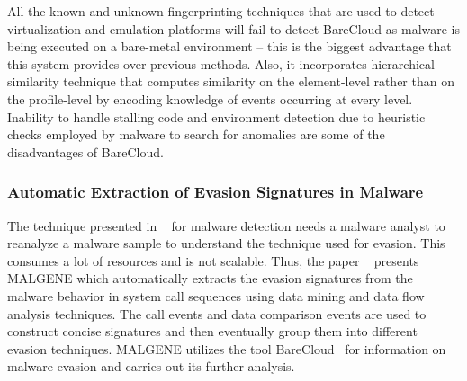 \documentclass[11pt]{article}
\begin{document}
		All the known and unknown fingerprinting techniques that are used to detect virtualization and emulation platforms will fail to detect BareCloud as malware is being executed on a bare-metal environment – this is the biggest advantage that this system provides over previous methods. Also, it incorporates hierarchical similarity technique that computes similarity on the element-level rather than on the profile-level by encoding knowledge of events occurring at every level. Inability to handle stalling code and environment detection due to heuristic checks employed by malware to search for anomalies are some of the disadvantages of BareCloud.
		
		\subsubsection{Automatic Extraction of Evasion Signatures in Malware}
		The technique presented in ~\cite{kirat2014barecloud} for malware detection needs a malware analyst to reanalyze a malware sample to understand the technique used for evasion. This consumes a lot of resources and is not scalable. Thus, the paper ~\cite{kirat2015malgene} presents MALGENE which automatically extracts the evasion signatures from the malware behavior in system call sequences using data mining and data flow analysis techniques. The call events and data comparison events are used to construct concise signatures and then eventually group them into different evasion techniques. MALGENE utilizes the tool BareCloud~\cite{kirat2014barecloud}  for information on malware evasion and carries out its further analysis.
\end{document}
